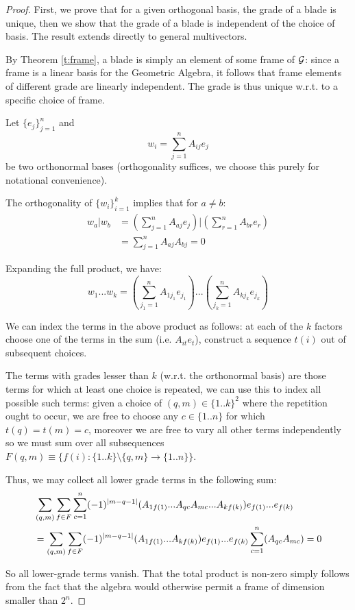 \begin{proof}
	First, we prove that for a given orthogonal basis, the grade of a blade is unique, then we show that the grade of a blade is independent of the choice of basis. The result extends directly to general multivectors.

	By Theorem \ref{t:frame}, a blade is simply an element of some frame of $\mathcal{G}$: since a frame is a linear basis for the Geometric Algebra, it follows that frame elements of different grade are linearly independent. The grade is thus unique w.r.t. to a specific choice of frame.


	Let $\{e_j\}_{j=1}^n$ and \[w_i = \sum_{j=1}^n A_{ij} e_j\] be two orthonormal bases (orthogonality suffices, we choose this purely for notational convenience).
	

	The orthogonality of $\{w_i\}_{i=1}^k$ implies that for $a \neq b$:
	\begin{align*}
		w_a|w_b &= (\sum_{j=1}^n A_{aj} e_j)|(\sum_{r=1}^n A_{br} e_r) \\
				&= \sum_{j=1}^n A_{aj}A_{bj} = 0
	\end{align*}

	Expanding the full product, we have:
	\[w_1...w_k = (\sum_{j_1=1}^n A_{1{j_1}}e_{j_1})...(\sum_{j_k=1}^n A_{k{j_k}}e_{j_k})\]

	We can index the terms in the above product as follows: at each of the $k$ factors choose one of the terms in the sum (i.e. $A_{it} e_t$), construct a sequence $t(i)$ out of subsequent choices.

	The terms with grades lesser than $k$ (w.r.t. the orthonormal basis) are those terms for which at least one choice is repeated, we can use this to index all possible such terms: given a choice of $(q, m) \in \{1..k\}^2$ where the repetition ought to occur, we are free to choose any $c \in \{1..n\}$ for which $t(q) = t(m) = c$, moreover we are free to vary all other terms independently so we must sum over all subsequences $F(q,m) \equiv \{f(i): \{1..k\}\setminus\{q,m\} \to \{1..n\}\}$. 

	Thus, we may collect all lower grade terms in the following sum:
	\begin{align*}
		&\sum_{(q,m)} \sum_{f \in F} \sum_{c=1}^n (-1)^{\left|m-q-1\right|}(A_{1f(1)}...A_{qc}A_{mc}...A_{kf(k)})e_{f(1)}...e_{f(k)} \\
	&= \sum_{(q,m)} \sum_{f \in F} (-1)^{\left|m-q-1\right|}(A_{1f(1)}...A_{kf(k)})e_{f(1)}...e_{f(k)} \sum_{c=1}^n (A_{qc}A_{mc}) = 0
	\end{align*}
	
	So all lower-grade terms vanish. That the total product is non-zero simply follows from the fact that the algebra would otherwise permit a frame of dimension smaller than $2^n$.
\end{proof}
